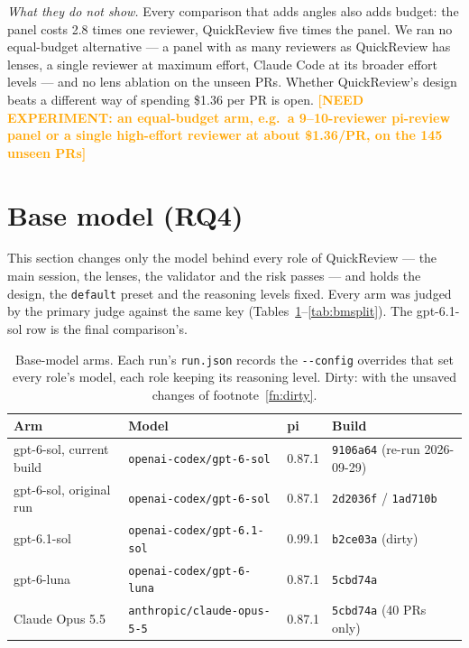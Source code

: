 \documentclass[11pt,a4paper]{article}
\newcommand{\NEEDEXP}[1]{\textcolor{orange}{\textbf{[NEED EXPERIMENT: #1]}}}
\newcommand{\qcr}{QuickReview}
\newcommand{\code}[1]{\texttt{#1}}
\begin{document}
\emph{What they do not show.} Every comparison that adds angles also adds
budget: the panel costs 2.8 times one reviewer, \qcr{} five times the panel.
We ran no equal-budget alternative --- a panel with as many reviewers as
\qcr{} has lenses, a single reviewer at maximum effort, Claude Code at its
broader effort levels --- and no lens ablation on the unseen PRs. Whether
\qcr{}'s design beats a different way of spending \$1.36 per PR is open.
\NEEDEXP{an equal-budget arm, e.g.\ a 9--10-reviewer pi-review panel or a
single high-effort reviewer at about \$1.36/PR, on the 145 unseen PRs}

\section{Base model (RQ4)}
\label{sec:basemodel}

This section changes only the model behind every role of \qcr{} --- the main
session, the lenses, the validator and the risk passes --- and holds the
design, the \code{default} preset and the reasoning levels fixed. Every arm
was judged by the primary judge against the same key
(Tables~\ref{tab:bmarms}--\ref{tab:bmsplit}). The gpt-6.1-sol row is the
final comparison's.

\begin{table}[!tbp]
  \centering
  \small
  \caption{Base-model arms. Each run's \code{run.json} records the
  \code{-{}-config} overrides that set every role's model, each role keeping
  its reasoning level. Dirty: with the unsaved changes of
  footnote~\ref{fn:dirty}.}
  \label{tab:bmarms}
  \begin{tabular}{llll}
    \toprule
    Arm & Model & pi & Build \\
    \midrule
    gpt-6-sol, current build & \code{openai-codex/gpt-6-sol} & 0.87.1 & \code{9106a64} (re-run 2026-09-29) \\
    gpt-6-sol, original run & \code{openai-codex/gpt-6-sol} & 0.87.1 & \code{2d2036f} / \code{1ad710b} \\
    gpt-6.1-sol & \code{openai-codex/gpt-6.1-sol} & 0.99.1 & \code{b2ce03a} (dirty) \\
    gpt-6-luna & \code{openai-codex/gpt-6-luna} & 0.87.1 & \code{5cbd74a} \\
    Claude Opus 5.5 & \code{anthropic/claude-opus-5-5} & 0.87.1 & \code{5cbd74a} (40 PRs only) \\
    \bottomrule
  \end{tabular}
\end{table}
\end{document}
